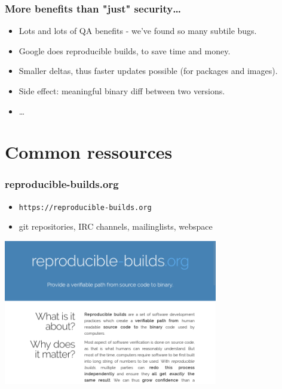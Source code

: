 \documentclass[14pt]{beamer}
\begin{document}
\begin{frame}[fragile]
 \frametitle{More benefits than "just" security…}
 \begin{itemize}
  \item Lots and lots of QA benefits - we've found so many subtile bugs.
  \item<2-5> Google does reproducible builds, to save time and money.
  \item<3-5> Smaller deltas, thus faster updates possible (for packages and
  images).
  \item<4-5> Side effect: meaningful binary diff between two versions.
  \item<5> …
 \end{itemize}
\end{frame}


\section{Common ressources}

\begin{frame}
 \frametitle{reproducible-builds.org}

 \begin{itemize}
  \item \texttt{https://reproducible-builds.org}
  \item git repositories, IRC channels, mailinglists, webspace
 \end{itemize}
 \begin{center}
 \includegraphics[width=0.7\textwidth]{images/rbwww1.png}
 \end{center}
\end{frame}
\end{document}
